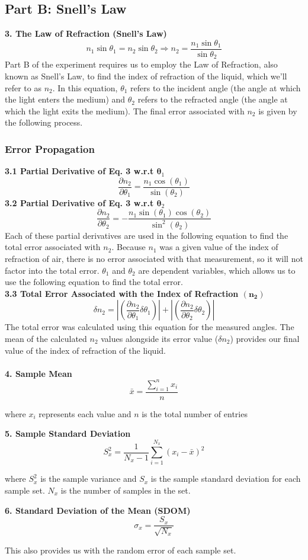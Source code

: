 \documentclass[12pt]{article}
\begin{document}
\subsection*{Part B: Snell's Law}
\noindent\textbf{3. The Law of Refraction (Snell's Law)}\[n_1\sin{\theta_1}=n_2\sin{\theta_2}\Rightarrow n_2=\frac{n_1\sin\theta_1}{\sin\theta_2}\]
    Part B of the experiment requires us to employ the Law of Refraction, also known as Snell's Law, to find the index of refraction of the liquid, which we'll refer to as $n_2$. In this equation, $\theta_1$ refers to the incident angle (the angle at which the light enters the medium) and $\theta_2$ refers to the refracted angle (the angle at which the light exits the medium). The final error associated with $n_2$ is given by the following process. 
\subsubsection*{Error Propagation}
\noindent\textbf{3.1 Partial Derivative of Eq. 3 w.r.t $\bm \theta_1$}\[\frac{\partial n_2}{\partial\theta_1}=\dfrac{n_1\cos\left({\theta}_1\right)}{\sin\left({\theta}_2\right)}\]
\textbf{3.2 Partial Derivative of Eq. 3 w.r.t $\bm \theta_2$}\[\frac{\partial n_2}{\partial\theta_2}=-\dfrac{n_1\sin\left({\theta}_1\right)\cos\left({\theta}_2\right)}{\sin^2\left({\theta}_2\right)}\]
    Each of these partial derivatives are used in the following equation to find the total error associated with $n_2$. Because $n_1$ was a given value of the index of refraction of air, there is no error associated with that measurement, so it will not factor into the total error. $\theta_1$ and $\theta_2$ are dependent variables, which allows us to use the following equation to find the total error.\\
\textbf{3.3 Total Error Associated with the Index of Refraction $\bm{({n_{2}})}$}\[\delta n_2= \left|\left(\frac{\partial n_2}{\partial \theta_1}\delta\theta_1\right)\right|+\left|\left(\frac{\partial n_2}{\partial \theta_2}\delta\theta_2\right)\right|\] 
    The total error was calculated using this equation for the measured angles. The mean of the calculated $n_2$ values alongside its error value ($\delta n_2$) provides our final value of the index of refraction of the liquid.\\
\\
\textbf{4. Sample Mean}\[\bar{x}=\frac{\sum\limits^{n}_{i=1}{x_i}}{n}\]
    \begin{center}
        where \(x_i\) represents each value and \(n\) is the total number of entries
    \end{center}
\textbf{5. Sample Standard Deviation}\[S_x^2=\frac{1}{N_x-1}\sum^{N_x}_{i=1}(x_i-\bar{x})^2 \]
    \begin{center}
        where \(S_x^2\) is the sample variance and \(S_x\) is the sample standard deviation for each sample set. \(N_x\) is the number of samples in the set. \\
    \end{center}
\textbf{6. Standard Deviation of the Mean (SDOM)}\[\sigma_x=\frac{S_x}{\sqrt{N_x}}\]
    \begin{center}
        This also provides us with the random error of each sample set.\\
    \end{center}
\newpage
\end{document}
